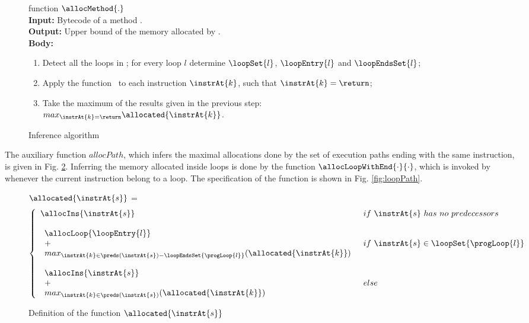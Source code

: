 \begin{figure}[!htp]
function $\allocMethod{.}$\\
\textbf{Input:} Bytecode of a method \methodd{} . \\
\textbf{Output:} Upper bound of the memory allocated by \methodd{} . \\
\textbf{Body:}
\begin{enumerate}
   \item Detect all the loops in \methodd{}; for every loop $l$ determine $\loopSet{l}$, $\loopEntry{l}$ and $\loopEndsSet{l}$;
   \item Apply the function \allocatedOnly \  to each instruction $\instrAt{k}$, such that $\instrAt{k} = \return$;
   \item Take the maximum of the results given in the previous step: \\
 $max_{\instrAt{k} = \return } \allocated{\instrAt{k}}$.
\end{enumerate}
\caption{\sc Inference algorithm}
\label{methodAlloc}
\end{figure}

The auxiliary function $allocPath$, which infers the maximal allocations done by the set of execution paths ending with the same \return{} instruction,
 is given in Fig. \ref{fig:allocMethod}.
Inferring the memory allocated inside loops is done by the function $\allocLoopWithEnd{\cdot}{\cdot}$, which is invoked by \allocatedOnly{} whenever the 
current instruction belong to a loop. The specification of the function is shown in Fig. \ref{fig:loopPath}.

\begin{figure}[!hbp]
$\allocated{\instrAt{s}}$ = 
$$ \left\{ \begin{array}{ll}
\allocIns{\instrAt{s} }   &  if \ \instrAt{s} \ has \ no \ predecessors \\
& \\
  \begin{array}{l}
            \allocLoop{\loopEntry{l}} \\
             + \\
            max_{\instrAt{k} \in \preds(\instrAt{s} )-\loopEndsSet{\progLoop{l}}}( \allocated{\instrAt{k}} ) \\
                   \end{array}      & if \  \instrAt{s} \in \loopSet{\progLoop{l}} \\
& \\
\begin{array}{l}
\allocIns{\instrAt{s}} \\
 + \\
max_{\instrAt{k} \in \preds(\instrAt{s} )}
 ( \allocated{\instrAt{k}} )
                       \end{array} & else 
\end{array}
\right.
$$
\caption{\sc Definition of the function $\allocated{\instrAt{s}}$} 
\label{fig:allocMethod}
\end{figure}


